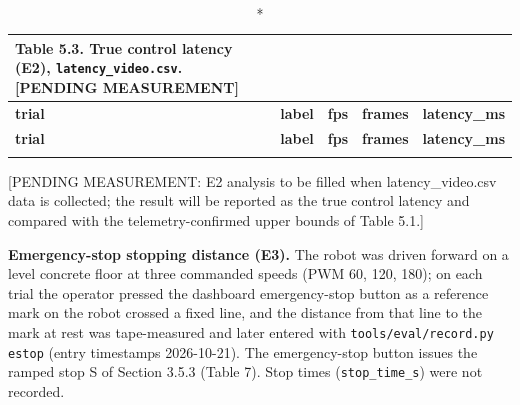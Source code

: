 \begin{center}
\begin{longtable}{|l|l|l|l|l|}
\caption*{Table 5.3. True control latency (E2), \texttt{latency\_video.csv}. [PENDING MEASUREMENT]}
\addcontentsline{lot}{table}{\protect\numberline{5.3}True control latency (E2), \texttt{latency\_video.csv}. [PENDING MEASUREMENT]}
\\
\hline
\textbf{trial} & \textbf{label} & \textbf{fps} & \textbf{frames} & \textbf{latency\_ms} \\
\hline
\endfirsthead
\hline
\textbf{trial} & \textbf{label} & \textbf{fps} & \textbf{frames} & \textbf{latency\_ms} \\
\hline
\endhead
 & & & & \\
\hline
\end{longtable}
\end{center}

[PENDING MEASUREMENT: E2 analysis to be filled when latency\_video.csv data is collected; the result will be reported as the true control latency and compared with the telemetry-confirmed upper bounds of Table 5.1.]

\textbf{Emergency-stop stopping distance (E3).} The robot was driven forward on a level concrete floor at three commanded speeds (PWM 60, 120, 180); on each trial the operator pressed the dashboard emergency-stop button as a reference mark on the robot crossed a fixed line, and the distance from that line to the mark at rest was tape-measured and later entered with \texttt{tools/eval/record.py estop} (entry timestamps 2026-10-21). The emergency-stop button issues the ramped stop S of Section 3.5.3 (Table 7). Stop times (\texttt{stop\_time\_s}) were not recorded.

